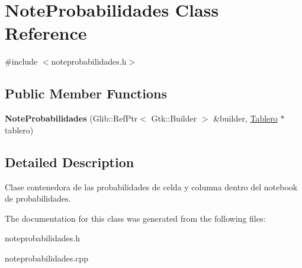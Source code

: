 \hypertarget{classNoteProbabilidades}{\section{Note\-Probabilidades Class Reference}
\label{classNoteProbabilidades}
}


{\ttfamily \#include $<$noteprobabilidades.\-h$>$}

\subsection*{Public Member Functions}
\begin{DoxyCompactItemize}
\item 
\hypertarget{classNoteProbabilidades_a0cf18f353a4443bca5f797781cc2ea8a}{{\bfseries Note\-Probabilidades} (Glib\-::\-Ref\-Ptr$<$ Gtk\-::\-Builder $>$ \&builder, \hyperlink{classTablero}{Tablero} $\ast$tablero)}\label{classNoteProbabilidades_a0cf18f353a4443bca5f797781cc2ea8a}

\end{DoxyCompactItemize}


\subsection{Detailed Description}
Clase contenedora de las probabilidades de celda y columna dentro del notebook de probabilidades. 

The documentation for this class was generated from the following files\-:\begin{DoxyCompactItemize}
\item 
noteprobabilidades.\-h\item 
noteprobabilidades.\-cpp\end{DoxyCompactItemize}
